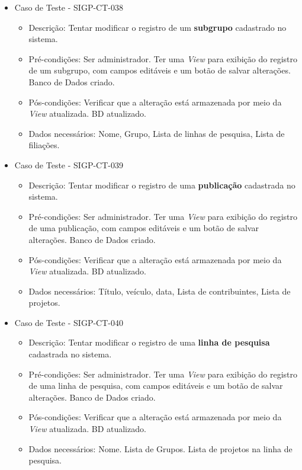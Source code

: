 \documentclass[11pt, a4paper]{book}
\begin{document}
\begin{itemize}
	\item Caso de Teste - SIGP-CT-038
	\begin{itemize}
	\item Descrição: Tentar modificar o registro de um  \textbf{subgrupo} cadastrado no sistema.
	\item Pré-condições: Ser administrador. Ter uma \emph{View} para exibição do registro de um subgrupo, com campos editáveis e um botão de salvar alterações. Banco de Dados criado.
	\item Pós-condições:  Verificar que a alteração está armazenada por meio da \emph{View} atualizada. BD atualizado.
	\item Dados necessários:  Nome, Grupo, Lista de linhas de pesquisa, Lista de filiações.
	\end{itemize}

\newpage

	\item Caso de Teste - SIGP-CT-039
	\begin{itemize}
	\item Descrição: Tentar modificar o registro de uma \textbf{publicação} cadastrada no sistema.
\item Pré-condições: Ser administrador. Ter uma \emph{View} para exibição do registro de uma publicação, com campos editáveis e um botão de salvar alterações. Banco de Dados criado.
	\item Pós-condições:  Verificar que a alteração está armazenada por meio da \emph{View} atualizada. BD atualizado.
	\item Dados necessários: Título, veículo, data, Lista de contribuintes, Lista de projetos.
	\end{itemize}

	\item Caso de Teste - SIGP-CT-040
	\begin{itemize}
	\item Descrição: Tentar modificar o registro de uma \textbf{linha de pesquisa} cadastrada no sistema.
	\item Pré-condições: Ser administrador. Ter uma \emph{View} para exibição do registro de uma linha de pesquisa, com campos editáveis e um botão de salvar alterações. Banco de Dados criado.
	\item Pós-condições:  Verificar que a alteração está armazenada por meio da \emph{View} atualizada. BD atualizado.
	\item Dados necessários: Nome. Lista de Grupos. Lista de projetos na linha de pesquisa.
	\end{itemize}


\end{itemize}
\end{document}
